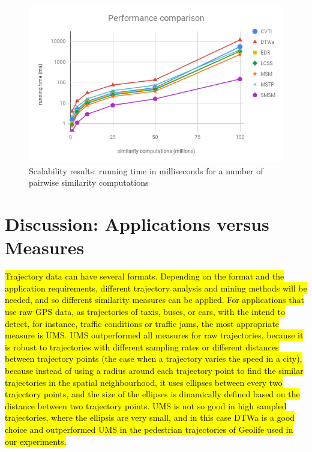 \documentclass[12pt]{article}
\begin{document}
\begin{figure}[ht!]
\centerline{
\centering
\includegraphics[width=\textwidth]{Images/Performance_comparison.png}
}
\caption{Scalability results: running time in milliseconds for a number of pairwise similarity computations}
\label{fig:performance_comparison}
\end{figure}

\section{Discussion: Applications versus Measures}\label{sec:discussion}

\hl{Trajectory data can have several formats. Depending on the format and the application requirements, different trajectory analysis and mining methods will be needed, and so different similarity measures can be applied. For applications that use raw GPS data, as trajectories of taxis, buses, or cars, with the intend to detect, for instance, traffic conditions or traffic jams, the most appropriate measure is UMS. UMS outperformed all measures for raw trajectories, because it is robust to trajectories with different sampling rates or different distances between trajectory points (the case when a trajectory varies the speed in a city), because instead of using a radius around each trajectory point to find the similar trajectories in the spatial neighbourhood, it uses ellipses between every two trajectory points, and the size of the ellipses is dinamically defined based on the distance between two trajectory points. UMS is not so good in high sampled trajectories, where the ellipsis are very small, and in this case DTWa is  a good choice and outperformed UMS in the pedestrian trajectories of Geolife used in our experiments.}
\end{document}
